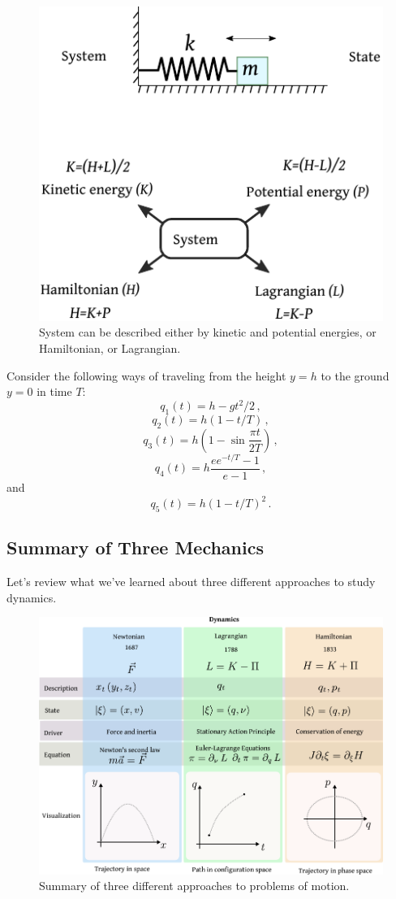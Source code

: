 \begin{figure}[htbp]
	\centering
	\includegraphics[scale=1.0]{systemDescriptions}
	\caption{System can be described either by kinetic and potential
		energies, or Hamiltonian, or Lagrangian.}
	\label{fig:systemDescriptions}
\end{figure}
\begin{exercise}
	Consider the following ways of traveling from the height $y=h$ to the ground $y=0$ in time $T$:
	\[
	q_1(t) = h - gt^2/2\,,
	\]
	\[
	q_2(t) = h(1 - t/T)\,,
	\]
	\[
	q_3(t) = h\left(1-\sin\frac{\pi t}{2T}\right)\,,
	\]
	\[
	q_4(t) = h\frac{ee^{-t/T}-1}{e-1}\,,
	\]
	and
	\[
	q_5(t) = h(1 - t/T)^2\,.
	\]
\end{exercise}
\subsection{Summary of Three Mechanics}
Let's review what we've learned about three different approaches to study dynamics.
\begin{figure}[htbp]
	\centering
	\includegraphics[scale=0.7]{threeMechanics}
	\caption{Summary of three different approaches to problems of motion.}
	\label{fig:threeMechanics}
\end{figure}

